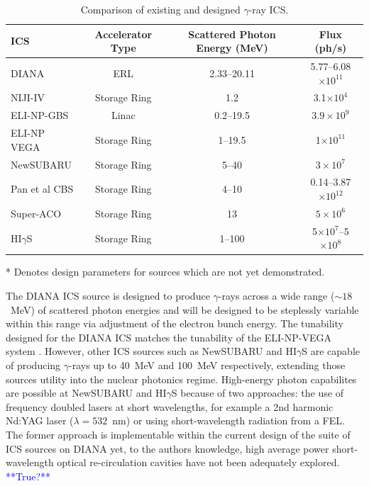 \documentclass[../main.tex]{subfiles}
\begin{document}
\begin{table}[!h]
\caption{Comparison of existing and designed $\gamma$-ray ICS.}
\begin{threeparttable}
\begin{tabular}{lccc}
\hline\hline
ICS & Accelerator Type & Scattered Photon Energy (\si{\mega\electronvolt}) & Flux (ph/\si{\second}) \\
\hline
DIANA\tnote{*} & ERL & 2.33--20.11 & 5.77--6.08$\times 10^{11}$ \\ 
NIJI-IV \cite{sei2017demonstration} & Storage Ring & 1.2 & 3.1$\times 10^{4}$ \\ 
ELI-NP-GBS\tnote{*} \cite{adriani2014technical} & Linac & 0.2--19.5 & $3.9\times 10^{9}$ \\
ELI-NP VEGA\tnote{*} \cite{tanaka2020current,elinp2019vega} & Storage Ring & 1--19.5 & 1$\times 10^{11}$\\
NewSUBARU \cite{utsunomiya2015gamma} & Storage Ring & 5--40 & $3\times 10^{7}$ \\
Pan et al CBS\tnote{*} \cite{pan2019design} & Storage Ring & 4--10 & 0.14--3.87$\times 10^{12}$ \\ 
Super-ACO \cite{nutarelli1998gamma} & Storage Ring & 13 & $5\times10^{6}$ \\
HI$\gamma$S \cite{weller2009research} & Storage Ring & 1--100 & 5$\times 10^{7}$--5$\times 10^{8}$ \\
\hline\hline
\end{tabular}
\begin{tablenotes}
\item[*]{Denotes design parameters for sources which are not yet demonstrated.}
\end{tablenotes}
\end{threeparttable}
\label{tab:gammaray_ICS_comparison}
\end{table}

The DIANA ICS source is designed to produce $\gamma$-rays across a wide  range ($\sim18$~\si{\mega\electronvolt}) of scattered photon energies and will be designed to be steplessly variable within this range via adjustment of the electron bunch energy. The tunability designed for the DIANA ICS matches the tunability of the ELI-NP-VEGA system \cite{tanaka2020current,elinp2019vega}. However, other ICS sources such as NewSUBARU and HI$\gamma$S are capable of producing $\gamma$-rays up to 40~\si{\mega\electronvolt} and 100~\si{\mega\electronvolt} respectively, extending those sources utility into the nuclear photonics regime. High-energy photon capabilites are possible at NewSUBARU and HI$\gamma$S because of two approaches: the use of frequency doubled lasers at short wavelengths, for example a 2nd harmonic Nd:YAG laser ($\lambda = 532$~\si{\nano\meter}) or using short-wavelength radiation from a FEL. The former approach is implementable within the current design of the suite of ICS sources on DIANA yet, to the authors knowledge, high average power short-wavelength optical re-circulation cavities have not been adequately explored. \textcolor{blue}{**True?**}  
\end{document}
